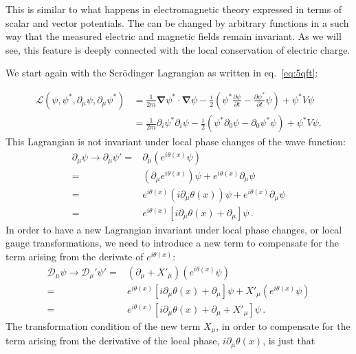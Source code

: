This is similar to what happens in electromagnetic theory expressed in terms of scalar and vector potentials. The can be changed by arbitrary functions in a such way that the measured electric and magnetic fields remain invariant. As we will see, this feature is deeply connected with the local conservation of electric charge. 

We start again with the Scrödinger Lagrangian as written in eq.~\eqref{eq:5qft}:

\begin{align}
  \mathcal{L}(\psi,\psi^*,\partial_\mu\psi,\partial_\mu\psi^*)&=\frac{1}{2m}\boldsymbol{\nabla}\psi^*\cdot\boldsymbol{\nabla}\psi-\frac{i}{2}
  \left(
\psi^*\frac{\partial\psi}{\partial t}-\frac{\partial\psi^*}{\partial t}\psi
  \right)+\psi^*V\psi\\
&=\frac{1}{2m}\partial_i\psi^*\partial_i\psi-\frac{i}{2}
  \left(\psi^*\partial_0\psi-\partial_0\psi^*\psi\right)+\psi^*V\psi.\nonumber
\end{align}
This Lagrangian is not invariant under local phase changes of the wave function: 
\begin{align}
  \partial_\mu \psi\to\partial_\mu \psi'=&\partial_\mu \left(e^{i\theta(x)}\psi\right)\nonumber\\
  =&\left(\partial_\mu e^{i\theta(x)}\right)\psi+e^{i\theta(x)}\partial_\mu\psi\nonumber\\
  =&e^{i\theta(x)}\left(i\partial_\mu \theta(x)\right)\psi+e^{i\theta(x)}\partial_\mu\psi\nonumber\\
  =&e^{i\theta(x)}\left[i\partial_\mu \theta(x)+\partial_\mu\right]\psi\,.
\end{align}
In order to have a new Lagrangian invariant under local phase changes, or local gauge transformations, we need to introduce a new term to compensate for the term arising from the derivate of $e^{i\theta(x)}$:
\begin{align}
\label{eq:165qft}
   \mathcal{D}_\mu \psi\to\mathcal{D}_\mu' \psi'=&(\partial_\mu+X'_\mu) \left(e^{i\theta(x)}\psi\right)\nonumber\\
   =&e^{i\theta(x)}\left[i\partial_\mu \theta(x)+\partial_\mu\right]\psi+X'_\mu \left(e^{i\theta(x)}\psi\right)\nonumber\\
   =&e^{i\theta(x)}\left[i\partial_\mu \theta(x)+\partial_\mu+X'_\mu \right]\psi\,.
\end{align}
The transformation condition of the new term $X_\mu$, in order to compensate for the term arising from the derivative of the local phase, $i\partial_\mu\theta(x)$, is just that

